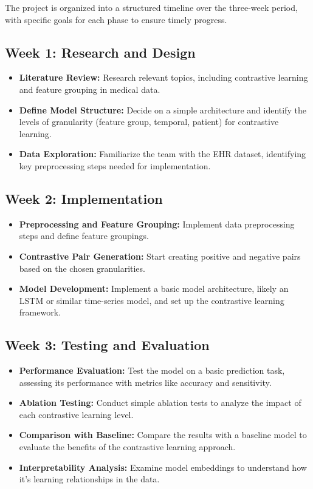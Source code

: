 \documentclass[a4paper]{article}
\begin{document}
    The project is organized into a structured timeline over the three-week period, with specific goals for each phase to ensure timely progress.
    
    \subsection*{Week 1: Research and Design}
    \begin{itemize}
        \item \textbf{Literature Review:} Research relevant topics, including contrastive learning and feature grouping in medical data.
        \item \textbf{Define Model Structure:} Decide on a simple architecture and identify the levels of granularity (feature group, temporal, patient) for contrastive learning.
        \item \textbf{Data Exploration:} Familiarize the team with the EHR dataset, identifying key preprocessing steps needed for implementation.
    \end{itemize}
    
    \subsection*{Week 2: Implementation}
    \begin{itemize}
        \item \textbf{Preprocessing and Feature Grouping:} Implement data preprocessing steps and define feature groupings.
        \item \textbf{Contrastive Pair Generation:} Start creating positive and negative pairs based on the chosen granularities.
        \item \textbf{Model Development:} Implement a basic model architecture, likely an LSTM or similar time-series model, and set up the contrastive learning framework.
    \end{itemize}
    
    \subsection*{Week 3: Testing and Evaluation}
    \begin{itemize}
        \item \textbf{Performance Evaluation:} Test the model on a basic prediction task, assessing its performance with metrics like accuracy and sensitivity.
        \item \textbf{Ablation Testing:} Conduct simple ablation tests to analyze the impact of each contrastive learning level.
        \item \textbf{Comparison with Baseline:} Compare the results with a baseline model to evaluate the benefits of the contrastive learning approach.
        \item \textbf{Interpretability Analysis:} Examine model embeddings to understand how it’s learning relationships in the data.
    \end{itemize}
    
\end{document}
